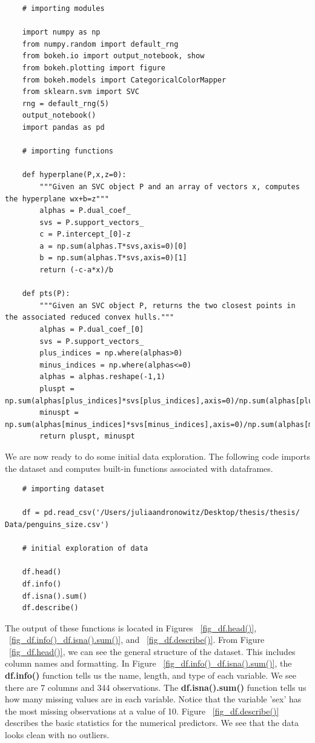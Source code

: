 \documentclass[12pt]{article}
\begin{document}
\begin{verbatim}
    # importing modules
    
    import numpy as np
    from numpy.random import default_rng
    from bokeh.io import output_notebook, show
    from bokeh.plotting import figure
    from bokeh.models import CategoricalColorMapper
    from sklearn.svm import SVC
    rng = default_rng(5)
    output_notebook()
    import pandas as pd

    # importing functions

    def hyperplane(P,x,z=0):
        """Given an SVC object P and an array of vectors x, computes the hyperplane wx+b=z"""
        alphas = P.dual_coef_
        svs = P.support_vectors_
        c = P.intercept_[0]-z
        a = np.sum(alphas.T*svs,axis=0)[0]
        b = np.sum(alphas.T*svs,axis=0)[1]
        return (-c-a*x)/b

    def pts(P):
        """Given an SVC object P, returns the two closest points in the associated reduced convex hulls."""
        alphas = P.dual_coef_[0]
        svs = P.support_vectors_
        plus_indices = np.where(alphas>0)
        minus_indices = np.where(alphas<=0)
        alphas = alphas.reshape(-1,1)
        pluspt = np.sum(alphas[plus_indices]*svs[plus_indices],axis=0)/np.sum(alphas[plus_indices])
        minuspt = np.sum(alphas[minus_indices]*svs[minus_indices],axis=0)/np.sum(alphas[minus_indices])
        return pluspt, minuspt

\end{verbatim}

We are now ready to do some initial data exploration. The following code imports the dataset and computes built-in functions associated with dataframes.

\begin{verbatim}
    # importing dataset

    df = pd.read_csv('/Users/juliaandronowitz/Desktop/thesis/thesis/ Data/penguins_size.csv')

    # initial exploration of data

    df.head()
    df.info()
    df.isna().sum()
    df.describe()
\end{verbatim}

The output of these functions is located in Figures ~\ref{fig_df.head()}, ~\ref{fig_df.info()_df.isna().sum()}, and ~\ref{fig_df.describe()}. From Figure ~\ref{fig_df.head()}, we can see the general structure of the dataset. This includes column names and formatting. In Figure ~\ref{fig_df.info()_df.isna().sum()}, the \textbf{df.info()} function tells us the name, length, and type of each variable. We see there are 7 columns and 344 observations. The \textbf{df.isna().sum()} function tells us how many missing values are in each variable. Notice that the variable 'sex' has the most missing observations at a value of 10. Figure ~\ref{fig_df.describe()} describes the basic statistics for the numerical predictors. We see that the data looks clean with no outliers.
\end{document}
